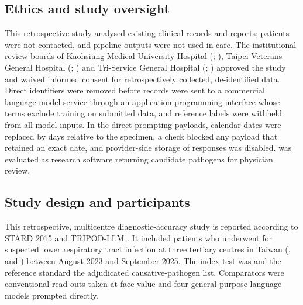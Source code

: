 
\subsection*{Ethics and study oversight}
This retrospective study analysed existing clinical records and \mngs reports; patients were not contacted, and pipeline outputs were not used in care. The institutional review boards of Kaohsiung Medical University Hospital (\kmuh; ), Taipei Veterans General Hospital (\tvgh; ) and Tri-Service General Hospital (\tsgh; ) approved the study and waived informed consent for retrospectively collected, de-identified data. Direct identifiers were removed before records were sent to a commercial language-model service through an application programming interface whose terms exclude training on submitted data, and reference labels were withheld from all model inputs. In the direct-prompting payloads, calendar dates were replaced by days relative to the \mngs specimen, a check blocked any payload that retained an exact date, and provider-side storage of responses was disabled.  \toolname was evaluated as research software returning candidate pathogens for physician review.

\subsection*{Study design and participants}
This retrospective, multicentre diagnostic-accuracy study is reported according to STARD 2015\cite{bossuyt2015stard} and TRIPOD-LLM\cite{gallifant2025tripod} . It included patients who underwent \mngs for suspected lower respiratory tract infection at three tertiary centres in Taiwan (\kmuh, \tvgh and \tsgh) between August 2023 and September 2025. The index test was \toolname and the reference standard the adjudicated causative-pathogen list. Comparators were conventional read-outs taken at face value and four general-purpose language models prompted directly.

